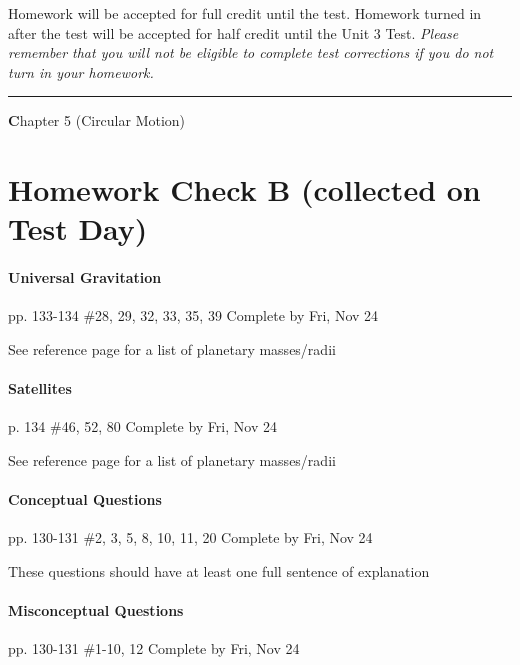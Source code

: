 \documentclass[10pt]{exam}
\def\mytitle{Chapter 5 (Circular Motion)}
\def\mymaketitle{
  \begin{flushleft}
    {\LARGE \textbf \mytitle \par}
  \end{flushleft}
}
\begin{document}
\noindent
{\footnotesize Homework will be accepted for full credit until the test.
Homework turned in after the test will be accepted for half credit
until the Unit 3 Test.
\emph{Please remember that you will not be eligible to complete 
test corrections if you do not turn in your homework.}}

\vspace{1em}
\hrule 



\pagebreak

\mymaketitle

\section*{Homework Check B (collected on Test Day)}

\paragraph{Universal Gravitation} pp. 133-134 \#28, 29, 32, 33, 35, 39
\dotfill Complete by Fri, Nov 24

{\sc See reference page for a list of planetary masses/radii}





\paragraph{Satellites} p. 134 \#46, 52, 80
\dotfill Complete by Fri, Nov 24

{\sc See reference page for a list of planetary masses/radii}




\paragraph{Conceptual Questions} pp. 130-131 \#2, 3, 5, 8, 10, 11, 20
\dotfill Complete by Fri, Nov 24
   
{\sc These questions should have at least one full sentence 
      of explanation}



\paragraph{Misconceptual Questions} pp. 130-131 \#1-10, 12
\dotfill Complete by Fri, Nov 24
   
\end{document}
